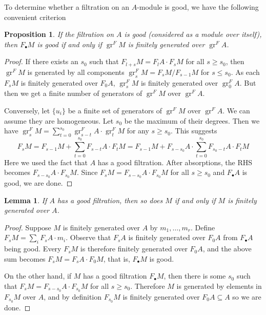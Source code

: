 \documentclass[11pt, a4paper]{article}
\newtheorem{lemma}[theorem]{Lemma}
\newtheorem{proposition}[theorem]{Proposition}
\theoremstyle{definition}
\newcommand{\gr}{\operatorname{gr}}
\begin{document}
    To determine whether a filtration on an $A$-module is good, we have the following convenient criterion
    \begin{proposition}\label{prop-good-gr-finite}
       If the filtration on $A$ is good (considered as a module over itself), then $F_\bullet M$ is good if and only if $\gr^F M$ is finitely generated over $\gr^F A$.
    \end{proposition}
    \begin{proof}
        If there exists an $s_0$ such that $F_{l+s}M=F_lA\cdot F_sM$ for all $s\geqslant s_0$, then $\gr^F M$ is generated by all components $\gr_s^FM=F_sM/F_{s-1}M$ for $s\leqslant s_0$. As each $F_sM$ is finitely generated over $F_0A$, $\gr_s^FM$ is finitely generated over $\gr_0^F A$. But then we get a finite number of generators of $\gr^FM$ over $\gr^FA$.

        Conversely, let $\{u_i\}$ be a finite set of generators of $\gr^F M$ over $\gr^F A$. We can assume they are homogeneous. Let $s_0$ be the maximum of their degrees. Then we have $\gr_s^F M=\sum_{t=0}^{s_0} \gr_{s-t}^FA\cdot\gr_t^F M$ for any $s\geqslant s_0$. This suggests
        \[F_sM=F_{s-1}M+\sum_{t=0}^{s_0} F_{s-t}A\cdot F_tM=F_{s-1}M+ F_{s-s_0}A\cdot\sum_{t=0}^{s_0} F_{s_0-t}A\cdot F_t M\]
        Here we used the fact that $A$ has a good filtration. After absorptions, the RHS becomes $F_{s-s_0}A\cdot F_{s_0}M$. Since $F_sM=F_{s-s_0}A\cdot F_{s_0}M$ for all $s\geqslant s_0$ and $F_\bullet A$ is good, we are done.
    \end{proof}
    \begin{lemma}\label{lem-good-finite}
        If $A$ has a good filtration, then so does $M$ if and only if $M$ is finitely generated over $A$.
    \end{lemma}
    \begin{proof}
        Suppose $M$ is finitely generated over $A$ by $m_1,\dots, m_r$. Define $F_sM=\sum_i F_sA\cdot m_i$. Observe that $F_sA$ is finitely generated over $F_0A$ from $F_\bullet A$ being good. Every $F_sM$ is therefore finitely generated over $F_0A$, and the above sum becomes $F_sM=F_sA\cdot F_0M$, that is, $F_\bullet M$ is good.

        On the other hand, if $M$ has a good filtration $F_\bullet M$, then there is some $s_0$ such that $F_sM=F_{s-s_0}A\cdot F_{s_0}M$ for all $s\geqslant s_0$.  Therefore $M$ is generated by elements in $F_{s_0}M$ over $A$, and by definition $F_{s_0}M$ is finitely generated over $F_0A\subseteq A$ so we are done.
    \end{proof}
\end{document}
